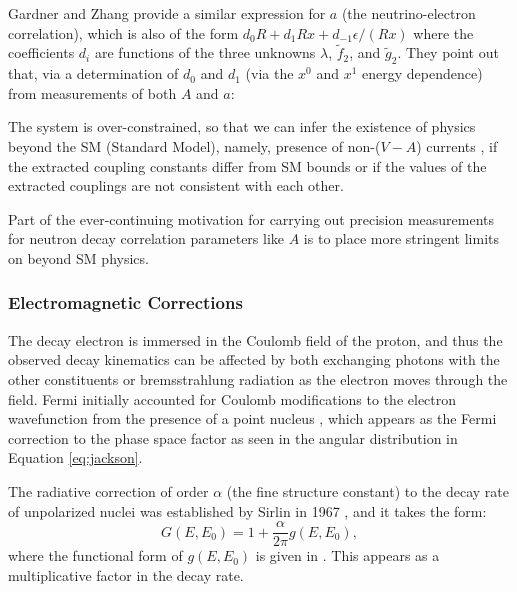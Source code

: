Gardner and Zhang provide a similar expression for $a$ (the neutrino-electron correlation),
which is also of the form $d_0R+d_1Rx+d_{-1}\epsilon/(Rx)$ where the coefficients $d_i$ are functions
of the three unknowns $\lambda$, $\tilde{f}_2$, and $\tilde{g}_2$.
They point out that, via a determination of $d_0$ and
$d_1$ (via the $x^0$ and $x^1$ energy dependence) from measurements of both $A$ and $a$:
%
\begin{displayquote}
  The system is over-constrained, so that we can infer the existence of physics
  beyond the SM (Standard Model), namely, presence of non-($V-A$) currents
  \cite{jackson1957a}, if the extracted coupling constants differ from SM bounds or if the
  values of the extracted couplings are not consistent with each other.
\end{displayquote}
Part of the ever-continuing motivation for carrying out precision measurements for
neutron decay correlation parameters like $A$ is to place more stringent limits on
beyond SM physics.



\subsubsection{Electromagnetic Corrections} \label{sssec:RadCorr}

The decay electron is immersed in the Coulomb field of the proton, and thus the observed
decay kinematics can be affected by both exchanging photons with the other
constituents or bremsstrahlung radiation as the electron moves through the field.
Fermi initially accounted for Coulomb modifications to the electron wavefunction from the
presence of a point nucleus \cite{fermi1934versuch,wilkinson1982}, which appears
as the Fermi correction to the phase space factor as seen in the
angular distribution in Equation \ref{eq:jackson}.

The radiative correction of order $\alpha$ (the fine structure constant) to the
decay rate of unpolarized nuclei was established
by Sirlin in 1967 \cite{sirlin1967}, and it takes the form:
%
\begin{equation}
  G(E,E_0) = 1+\frac{\alpha}{2\pi}g(E,E_0),
\end{equation}
where the functional form of $g(E,E_0)$ is given in \cite{sirlin1967}. This appears
as a multiplicative factor in the decay rate.

